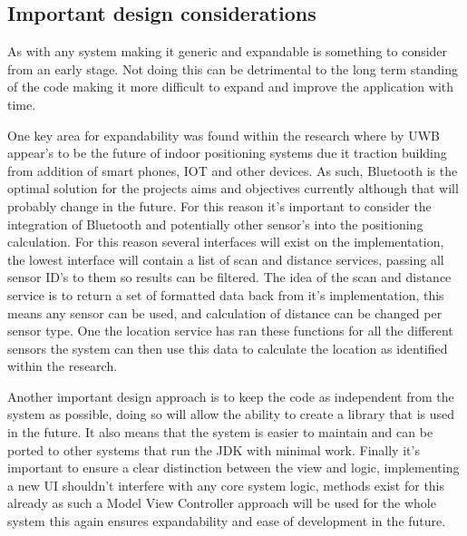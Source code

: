 \subsection{Important design considerations}
As with any system making it generic and expandable is something to consider from an early stage. Not doing this can be detrimental to the long term standing of the code making it more difficult to expand and improve the application with time.

One key area for expandability was found within the research where by UWB appear's to be the future of indoor positioning systems due it traction building from addition of smart phones, IOT and other devices. As such, Bluetooth is the optimal solution for the projects aims and objectives currently although that will probably change in the future. For this reason it's important to consider the integration of Bluetooth and potentially other sensor's into the positioning calculation. For this reason several interfaces will exist on the implementation, the lowest interface will contain a list of scan and distance services, passing all sensor ID's to them so results can be filtered. The idea of the scan and distance service is to return a set of formatted data back from it's implementation, this means any sensor can be used, and calculation of distance can be changed per sensor type. One the location service has ran these functions for all the different sensors the system can then use this data to calculate the location as identified within the research.

Another important design approach is to keep the code as independent from the system as possible, doing so will allow the ability to create a library that is used in the future. It also means that the system is easier to maintain and can be ported to other systems that run the JDK with minimal work. Finally it's important to ensure a clear distinction between the view and logic, implementing a new UI shouldn't interfere with any core system logic, methods exist for this already as such a Model View Controller approach will be used for the whole system this again ensures expandability and ease of development in the future.